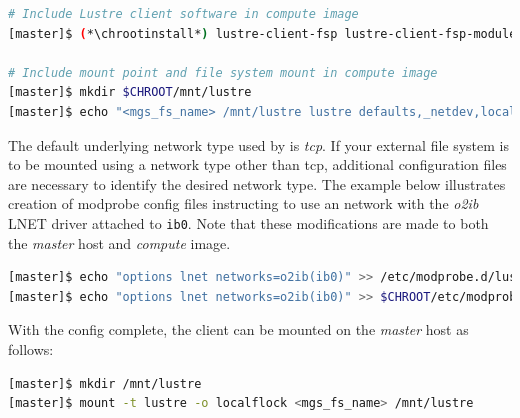 \documentclass[letterpaper]{article}
\newcommand{\chrootinstall}{yum -y --installroot=\$CHROOT install}
\begin{document}
\begin{lstlisting}[language=bash,keywords={},upquote=true]
# Include Lustre client software in compute image
[master]$ (*\chrootinstall*) lustre-client-fsp lustre-client-fsp-modules

# Include mount point and file system mount in compute image
[master]$ mkdir $CHROOT/mnt/lustre
[master]$ echo "<mgs_fs_name> /mnt/lustre lustre defaults,_netdev,localflock 0 0" >> $CHROOT/etc/fstab
\end{lstlisting}

The default underlying network type used by \Lustre{} is {\em tcp}. If your
external \Lustre{} file system is to be mounted using a network type other than
tcp, additional configuration files are necessary to identify the desired
network type. The example below illustrates creation of modprobe config files
instructing \Lustre{} to use an \InfiniBand{} network with the {\em o2ib} LNET driver
attached to \texttt{ib0}. Note that these modifications are made to both the
{\em master} host and {\em compute} image.

\begin{lstlisting}[language=bash,keywords={},upquote=true]
[master]$ echo "options lnet networks=o2ib(ib0)" >> /etc/modprobe.d/lustre.conf
[master]$ echo "options lnet networks=o2ib(ib0)" >> $CHROOT/etc/modprobe.d/lustre.conf
\end{lstlisting}

With the \Lustre{} config complete, the client can be mounted on the {\em master}
host as follows:
\begin{lstlisting}[language=bash,keywords={},upquote=true]
[master]$ mkdir /mnt/lustre
[master]$ mount -t lustre -o localflock <mgs_fs_name> /mnt/lustre
\end{lstlisting}

\end{document}
